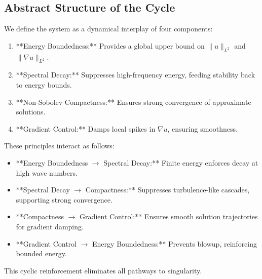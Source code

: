 \subsection{Abstract Structure of the Cycle}
We define the system as a dynamical interplay of four components:
\begin{enumerate}
    \item **Energy Boundedness:** Provides a global upper bound on $\|u\|_{L^2}$ and $\|\nabla u\|_{L^2}$.
    \item **Spectral Decay:** Suppresses high-frequency energy, feeding stability back to energy bounds.
    \item **Non-Sobolev Compactness:** Ensures strong convergence of approximate solutions.
    \item **Gradient Control:** Damps local spikes in $\nabla u$, ensuring smoothness.
\end{enumerate}
These principles interact as follows:
\begin{itemize}
    \item **Energy Boundedness \(\to\) Spectral Decay:** Finite energy enforces decay at high wave numbers.
    \item **Spectral Decay \(\to\) Compactness:** Suppresses turbulence-like cascades, supporting strong convergence.
    \item **Compactness \(\to\) Gradient Control:** Ensures smooth solution trajectories for gradient damping.
    \item **Gradient Control \(\to\) Energy Boundedness:** Prevents blowup, reinforcing bounded energy.
\end{itemize}
This cyclic reinforcement eliminates all pathways to singularity.

